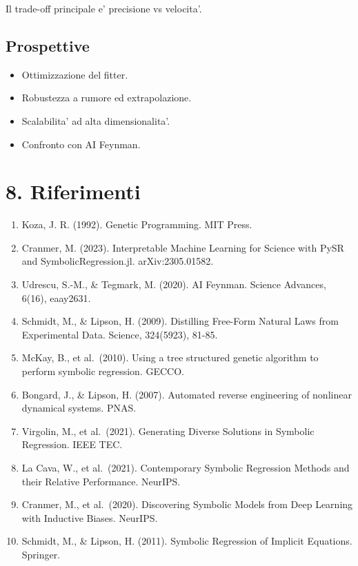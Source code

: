 \documentclass[
]{article}
\providecommand{\tightlist}{%
  \setlength{\itemsep}{0pt}\setlength{\parskip}{0pt}}
\begin{document}
Il trade-off principale e' precisione vs velocita'.

\subsection{Prospettive}\label{prospettive}

\begin{itemize}
\tightlist
\item
  Ottimizzazione del fitter.
\item
  Robustezza a rumore ed extrapolazione.
\item
  Scalabilita' ad alta dimensionalita'.
\item
  Confronto con AI Feynman.
\end{itemize}

\section{8. Riferimenti}\label{riferimenti}

\begin{enumerate}
\def\labelenumi{\arabic{enumi}.}
\item
  Koza, J. R. (1992). Genetic Programming. MIT Press.
\item
  Cranmer, M. (2023). Interpretable Machine Learning for Science with
  PySR and SymbolicRegression.jl. arXiv:2305.01582.
\item
  Udrescu, S.-M., \& Tegmark, M. (2020). AI Feynman. Science Advances,
  6(16), eaay2631.
\item
  Schmidt, M., \& Lipson, H. (2009). Distilling Free-Form Natural Laws
  from Experimental Data. Science, 324(5923), 81-85.
\item
  McKay, B., et al.~(2010). Using a tree structured genetic algorithm to
  perform symbolic regression. GECCO.
\item
  Bongard, J., \& Lipson, H. (2007). Automated reverse engineering of
  nonlinear dynamical systems. PNAS.
\item
  Virgolin, M., et al.~(2021). Generating Diverse Solutions in Symbolic
  Regression. IEEE TEC.
\item
  La Cava, W., et al.~(2021). Contemporary Symbolic Regression Methods
  and their Relative Performance. NeurIPS.
\item
  Cranmer, M., et al.~(2020). Discovering Symbolic Models from Deep
  Learning with Inductive Biases. NeurIPS.
\item
  Schmidt, M., \& Lipson, H. (2011). Symbolic Regression of Implicit
  Equations. Springer.
\end{enumerate}
\end{document}
